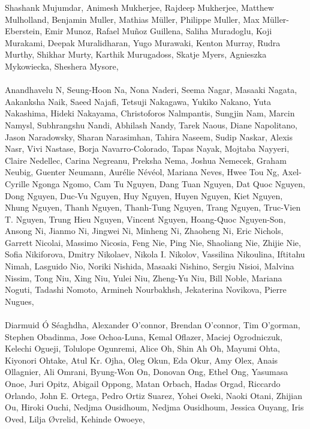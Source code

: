 Shashank Mujumdar, Animesh Mukherjee, Rajdeep Mukherjee, Matthew Mulholland, Benjamin Muller, Mathias Müller, Philippe Muller, Max Müller-Eberstein, Emir Munoz, Rafael Muñoz Guillena, Saliha Muradoglu, Koji Murakami, Deepak Muralidharan, Yugo Murawaki, Kenton Murray, Rudra Murthy, Shikhar Murty, Karthik Murugadoss, Skatje Myers, Agnieszka Mykowiecka, Sheshera Mysore,
\paragraph{}Anandhavelu N, Seung-Hoon Na, Nona Naderi, Seema Nagar, Masaaki Nagata, Aakanksha Naik, Saeed Najafi, Tetsuji Nakagawa, Yukiko Nakano, Yuta Nakashima, Hideki Nakayama, Christoforos Nalmpantis, Sungjin Nam, Marcin Namysl, Subhrangshu Nandi, Abhilash Nandy, Tarek Naous, Diane Napolitano, Jason Naradowsky, Sharan Narasimhan, Tahira Naseem, Sudip Naskar, Alexis Nasr, Vivi Nastase, Borja Navarro-Colorado, Tapas Nayak, Mojtaba Nayyeri, Claire Nedellec, Carina Negreanu, Preksha Nema, Joshua Nemecek, Graham Neubig, Guenter Neumann, Aurélie Névéol, Mariana Neves, Hwee Tou Ng, Axel-Cyrille Ngonga Ngomo, Cam Tu Nguyen, Dang Tuan Nguyen, Dat Quoc Nguyen, Dong Nguyen, Duc-Vu Nguyen, Huy Nguyen, Huyen Nguyen, Kiet Nguyen, Nhung Nguyen, Thanh Nguyen, Thanh-Tung Nguyen, Trang Nguyen, Truc-Vien T. Nguyen, Trung Hieu Nguyen, Vincent Nguyen, Hoang-Quoc Nguyen-Son, Ansong Ni, Jianmo Ni, Jingwei Ni, Minheng Ni, Zhaoheng Ni, Eric Nichols, Garrett Nicolai, Massimo Nicosia, Feng Nie, Ping Nie, Shaoliang Nie, Zhijie Nie, Sofia Nikiforova, Dmitry Nikolaev, Nikola I. Nikolov, Vassilina Nikoulina, Iftitahu Nimah, Lasguido Nio, Noriki Nishida, Masaaki Nishino, Sergiu Nisioi, Malvina Nissim, Tong Niu, Xing Niu, Yulei Niu, Zheng-Yu Niu, Bill Noble, Mariana Noguti, Tadashi Nomoto, Armineh Nourbakhsh, Jekaterina Novikova, Pierre Nugues,
\paragraph{}Diarmuid Ó Séaghdha, Alexander O'connor, Brendan O'connor, Tim O'gorman, Stephen Obadinma, Jose Ochoa-Luna, Kemal Oflazer, Maciej Ogrodniczuk, Kelechi Ogueji, Tolulope Ogunremi, Alice Oh, Shin Ah Oh, Mayumi Ohta, Kiyonori Ohtake, Atul Kr. Ojha, Oleg Okun, Eda Okur, Amy Olex, Anais Ollagnier, Ali Omrani, Byung-Won On, Donovan Ong, Ethel Ong, Yasumasa Onoe, Juri Opitz, Abigail Oppong, Matan Orbach, Hadas Orgad, Riccardo Orlando, John E. Ortega, Pedro Ortiz Suarez, Yohei Oseki, Naoki Otani, Zhijian Ou, Hiroki Ouchi, Nedjma Ousidhoum, Nedjma Ousidhoum, Jessica Ouyang, Iris Oved, Lilja Øvrelid, Kehinde Owoeye,
